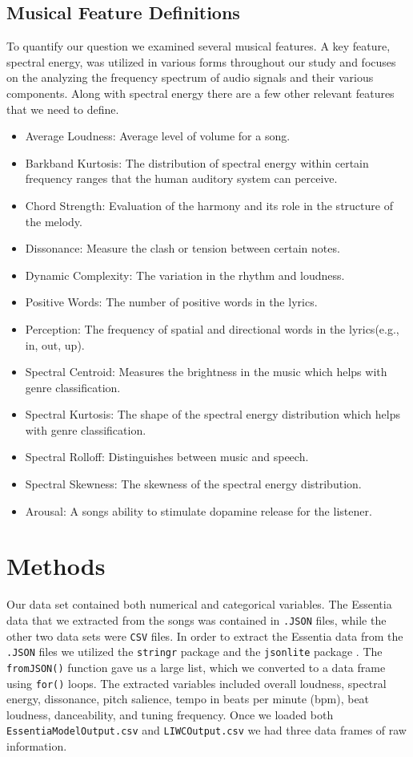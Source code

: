 \documentclass{article}\usepackage[]{graphicx}\usepackage[]{xcolor}
\begin{document}
\begin{multicols}{2}
\subsection{Musical Feature Definitions}
To quantify our question we examined several musical features. A key feature, spectral energy, was utilized in various forms throughout our study and focuses on the analyzing the frequency spectrum of audio signals and their various components. Along with spectral energy there are a few other relevant features that we need to define. 
\begin{itemize}\itemsep0em
\item Average Loudness: Average level of volume for a song.
\item Barkband Kurtosis: The distribution of spectral energy within certain frequency ranges that the human auditory system can perceive.
\item Chord Strength: Evaluation of the harmony and its role in the structure of the melody.
\item Dissonance: Measure the clash or tension between certain notes.
\item Dynamic Complexity: The variation in the rhythm and loudness.
\item Positive Words: The number of positive words in the lyrics. 
\item Perception: The frequency of spatial and directional words in the lyrics(e.g., in, out, up).
\item Spectral Centroid: Measures the brightness in the music which helps with genre classification.
\item Spectral Kurtosis: The shape of the spectral energy distribution which helps with genre classification.
\item Spectral Rolloff: Distinguishes between music and speech.
\item Spectral Skewness: The skewness of the spectral energy distribution.
\item Arousal: A songs ability to stimulate dopamine release for the listener. 
\end{itemize}

\section{Methods}
Our data set contained both numerical and categorical variables. 
The Essentia data that we extracted from the songs was contained in \texttt{.JSON} files, while the other two data sets were \texttt{CSV} files. In order to extract the Essentia \citep{essentia} data from the \texttt{.JSON} files we utilized the \texttt{stringr} package \citep{stringr} and the \texttt{jsonlite} package \citep{jsonlite}. The {\tt{fromJSON()}} function gave us a large list, which we converted to a data frame using \verb|for()| loops. The extracted variables included overall loudness, spectral energy, dissonance, pitch salience, tempo in beats per minute (bpm), beat loudness, danceability, and tuning frequency. Once we loaded both \texttt{EssentiaModelOutput.csv} and \texttt{LIWCOutput.csv} we had three data frames of raw information. 
 

\end{multicols}
\end{document}

